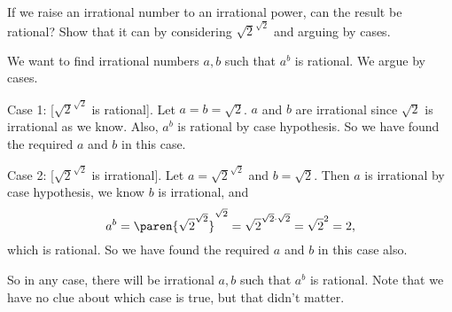 \documentclass[handout]{mcs}
\begin{document}
\begin{problem}
If we raise an irrational number to an irrational power, can the result be
rational?  Show that it can by considering $\sqrt{2}^{\sqrt{2}}$ and
arguing by cases.

\begin{solution}
We want to find irrational numbers $a,b$ such that $a^b$ is rational.
We argue by cases.

Case 1: [$\sqrt{2}^{\sqrt{2}}$ is rational].  Let $a = b = \sqrt{2}$.  $a$
and $b$ are irrational since $\sqrt{2}$ is irrational as we know.  Also,
$a^b$ is rational by case hypothesis.  So we have found the required $a$
and $b$ in this case.

Case 2: [$\sqrt{2}^{\sqrt{2}}$ is irrational].  Let $a =\sqrt{2}^{\sqrt{2}}$
and $b = \sqrt{2}$.  Then $a$ is irrational by case hypothesis, we know
$b$ is irrational, and
\[
a^b = \paren{\sqrt{2}^{\sqrt{2}}}^{\sqrt{2}} =
      \sqrt{2}^{\sqrt{2} \cdot \sqrt{2}} = \sqrt{2}^2 = 2,
\]
which is rational.  So we have found the required $a$
and $b$ in this case also.

So in any case, there will be irrational $a,b$ such that $a^b$ is
rational.  Note that we have no clue about which case is true, but that
didn't matter.
\end{solution}
\end{problem}
\end{document}
